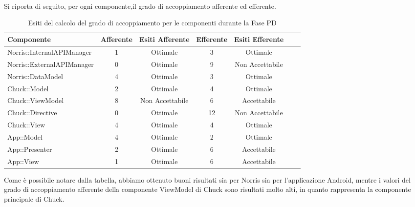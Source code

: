			Si riporta di seguito, per ogni componente,il grado di accoppiamento afferente ed efferente.
			\begin{table}[H]
				\centering
					\begin{tabu}{| l | c | c | c | c | c | c | }
						\hline
						Componente					& Afferente & Esiti Afferente & Efferente & Esiti Efferente 	\\ \hline \hline
						Norris::InternalAPIManager	& 1 & Ottimale & 3 & Ottimale  \\ \hline
						Norris::ExternalAPIManager  & 0 & Ottimale & 9 & Non Accettabile   \\ \hline
						Norris::DataModel  			& 4 & Ottimale & 3 & Ottimale   \\ \hline
						Chuck::Model 				& 2 & Ottimale & 4 & Ottimale   \\ \hline
						Chuck::ViewModel 			& 8 & Non Accettabile & 6 & Accettabile   \\ \hline
						Chuck::Directive 			& 0 & Ottimale & 12 & Non Accettabile   \\ \hline
						Chuck::View 				& 4 & Ottimale & 4 & Ottimale   \\ \hline
						App::Model 					& 4 & Ottimale & 2 & Ottimale   \\ \hline
						App::Presenter 				& 2 & Ottimale & 6 & Accettabile   \\ \hline
						App::View 					& 1 & Ottimale & 6 & Accettabile   \\ \hline
					\end{tabu}
				\caption{Esiti del calcolo del grado di accoppiamento per le componenti durante la Fase PD}
			\end{table}
			Come è possibile notare dalla tabella, abbiamo ottenuto buoni risultati sia per Norris sia per l'applicazione Android, mentre i valori del grado di accoppiamento afferente della componente ViewModel di Chuck sono risultati molto alti, in quanto rappresenta la componente principale di Chuck.